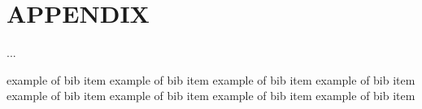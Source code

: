 \documentclass[letterpaper, 10 pt, conference]{ieeeconf}  %
\begin{document}






\section*{APPENDIX}

...



\begin{thebibliography}{99}

 example of bib item 
 example of bib item 
 example of bib item 
 example of bib item 
 example of bib item 
 example of bib item 
 example of bib item 
 example of bib item 

\end{thebibliography}
\end{document}
